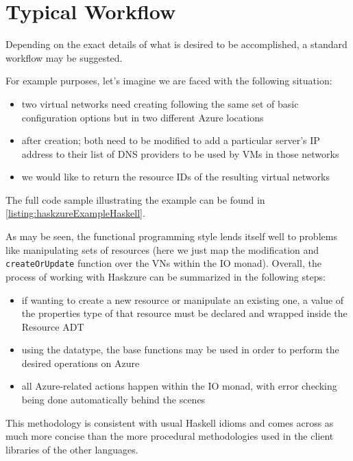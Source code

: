 \documentclass[11pt]{report}
\begin{document}
\section{Typical Workflow}

Depending on the exact details of what is desired to be accomplished, a
standard workflow may be suggested. \newline

For example purposes, let's imagine we are faced with the following situation:

\begin{itemize}
    \item{} two virtual networks need creating following the same set of
        basic configuration options but in two different Azure locations
    \item{} after creation; both need to be modified to add a particular server's
        IP address to their list of DNS providers to be used by VMs in those
        networks
    \item{} we would like to return the resource IDs of the resulting virtual
        networks
\end{itemize}

The full code sample illustrating the example can be found in
\autoref{listing:haskzureExampleHaskell}.

As may be seen, the functional programming style lends itself well to problems
like manipulating sets of resources (here we just map the modification and
\texttt{createOrUpdate} function over the VNs within the IO monad). Overall,
the process of working with Haskzure can be summarized in the following steps:

\begin{itemize}
    \item{} if wanting to create a new resource or manipulate an existing one,
        a value of the properties type of that resource must be declared and
        wrapped inside the Resource ADT
    \item{} using the datatype, the base functions may be used in order to
        perform the desired operations on Azure
    \item{} all Azure-related actions happen within the IO monad, with error
        checking being done automatically behind the scenes
\end{itemize}

This methodology is consistent with usual Haskell idioms and comes across as
much more concise than the more procedural methodologies used in the client
libraries of the other languages.
\end{document}
